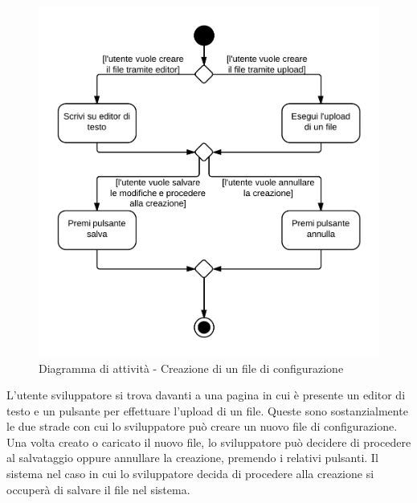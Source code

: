 \begin{figure}[H]
\centering
\includegraphics[scale=0.2]{uml/MaaS - Crea file di configurazione.png}
\caption{Diagramma di attività - Creazione di un file di configurazione}
\end{figure}

L'utente sviluppatore si trova davanti a una pagina in cui è presente un editor di testo e un pulsante per effettuare l'upload di un file. Queste sono sostanzialmente le due strade con cui lo sviluppatore può creare un nuovo file di configurazione. Una volta creato o caricato il nuovo file, lo sviluppatore può decidere di procedere al salvataggio oppure annullare la creazione, premendo i relativi pulsanti. Il sistema  nel caso in cui lo sviluppatore decida di procedere alla creazione si occuperà di salvare il file nel sistema.
